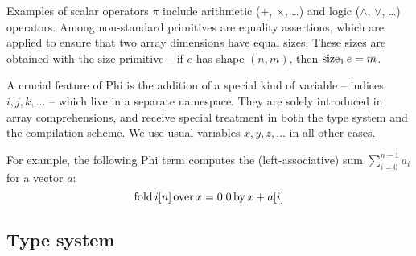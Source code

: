 Examples of scalar operators $\pi$ include arithmetic ($+$, $\times$, \dots) and logic ($\land$, $\lor$, \dots) operators. Among non-standard primitives are equality assertions, which are applied to ensure that two array dimensions have equal sizes. These sizes are obtained with the $\mathrm{size}$ primitive -- if $e$ has shape $(n, m)$, then $\mathrm{size}_{1}\, {e} = m$.

A crucial feature of Phi is the addition of a special kind of variable -- indices $i, j, k, \dots$ -- which live in a separate namespace. They are solely introduced in array comprehensions, and receive special treatment in both the type system and the compilation scheme. We use usual variables $x, y, z, \dots$ in all other cases.

For example, the following Phi term computes the (left-associative) sum $\sum_{i=0}^{n-1} a_i$ for a vector $a$:
$$ \mathrm{fold}\,{i}[{n}]\,\mathrm{over}\,{x} = {0.0}\,\mathrm{by}\,{x + a[i]} $$

\subsection{Type system}

\newcommand{\phifloattype}{\mathrm{Float}}
\newcommand{\phiinttype}{\mathrm{Int}}
\newcommand{\phinattype}{\phiinttype}
\newcommand{\phibooltype}{\mathrm{Bool}}
\newcommand{\phivectype}[1]{\Box{#1}}
\newcommand{\phipairtype}[2]{{#1} \times {#2}}

